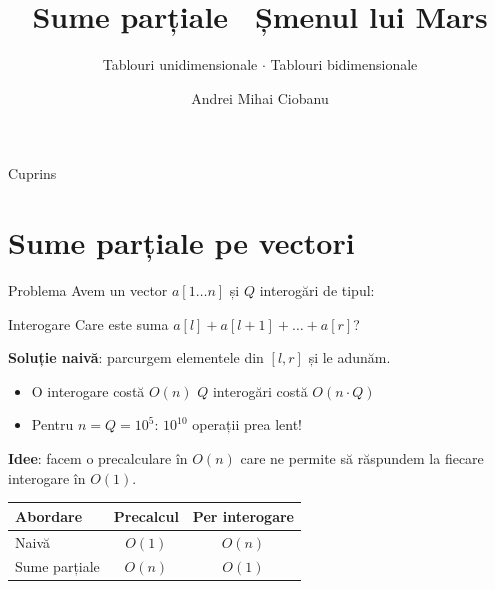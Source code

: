 \documentclass{beamer}
\title{Sume parțiale \textbar\ Șmenul lui Mars}
\subtitle{Tablouri unidimensionale $\cdot$ Tablouri bidimensionale}
\author{Andrei Mihai Ciobanu}
\institute{Algolymp Summer School}
\date{}
\begin{document}
\begin{frame}[shrink]
  \titlepage
\end{frame}

\begin{frame}{Cuprins}
  \tableofcontents
\end{frame}

\section{Sume parțiale pe vectori}

\begin{frame}{Problema}
  Avem un vector $a[1 \ldots n]$ și $Q$ interogări de tipul:
  \begin{block}{Interogare}
    Care este suma $a[l] + a[l+1] + \ldots + a[r]$?
  \end{block}

  \smallskip
  \textbf{Soluție naivă}: parcurgem elementele din $[l, r]$ și le adunăm.
  \begin{itemize}
    \item O interogare costă $O(n)$ \textemdash{} $Q$ interogări costă $O(n \cdot Q)$
    \item Pentru $n = Q = 10^5$: $10^{10}$ operații \textemdash{} prea lent!
  \end{itemize}

  \smallskip
  \textbf{Idee}: facem o precalculare în $O(n)$ care ne permite să răspundem la fiecare interogare în $O(1)$.

  \begin{center}
  \begin{tabular}{lcc}
    \toprule
    Abordare & Precalcul & Per interogare \\
    \midrule
    Naivă         & $O(1)$    & $O(n)$ \\
    Sume parțiale & $O(n)$    & $O(1)$ \\
    \bottomrule
  \end{tabular}
  \end{center}
\end{frame}
\end{document}
